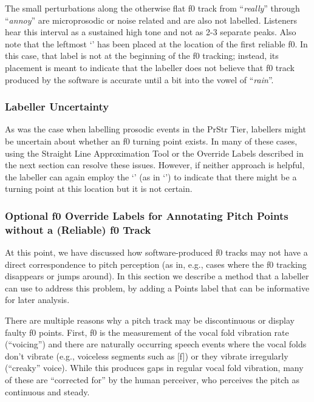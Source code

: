 \documentclass[11pt, twoside]{memoir}
\def\textlabel#1{{\relsize{-.5}\fontspec[Mapping=tex-text]{Roboto Mono}{#1}}}
\def\langtext#1{\textit{#1}}
\begin{document}
The small perturbations along the otherwise flat f0 track from “\langtext{really}” through “\langtext{annoy}” are microprosodic or noise related and are also not labelled. Listeners hear this interval as a sustained high tone and not as 2-3 separate peaks. Also note that the leftmost ‘\textlabel{0}’ has been placed at the location of the first reliable f0. In this case, that label is not at the beginning of the f0 tracking; instead, its placement is meant to indicate that the labeller does not believe that f0 track produced by the software is accurate until a bit into the vowel of “\langtext{rain}”.


\subsubsection{Labeller Uncertainty}\label{sec:labeller-uncertainty-points}

As was the case when labelling prosodic events in the PrStr Tier, labellers might be uncertain about whether an f0 turning point exists. In many of these cases, using the Straight Line Approximation Tool or the Override Labels described in the next section can resolve these issues. However, if neither approach is helpful, the labeller can again employ the ‘\textlabel{?}’ (as in ‘\textlabel{?0}’) to indicate that there might be a turning point at this location but it is not certain.

\subsubsection{Optional f0 Override Labels for Annotating Pitch Points without a (Reliable) f0 Track}\label{sec:optional-f0-override-labels-for-annotating-pitch-points-without-a-reliable-f0-track}

At this point, we have discussed how software-produced f0 tracks may not have a direct correspondence to pitch perception (as in, e.g., cases where the f0 tracking disappears or jumps around). In this section we describe a method that a labeller can use to address this problem, by adding a Points label that can be informative for later analysis.

There are multiple reasons why a pitch track may be discontinuous or display faulty f0 points. First, f0 is the measurement of the vocal fold vibration rate (“voicing”) and there are naturally occurring speech events where the vocal folds don’t vibrate (e.g., voiceless segments such as [f]) or they vibrate irregularly (“creaky” voice). While this produces gaps in regular vocal fold vibration, many of these are “corrected for” by the human perceiver, who perceives the pitch as continuous and steady.
\end{document}
